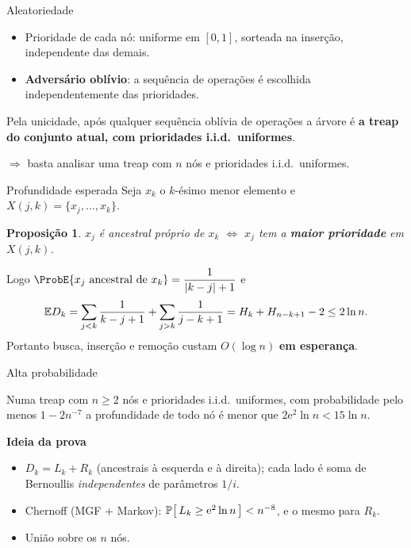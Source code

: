 \documentclass[aspectratio=169,11pt]{beamer}
\newtheorem{proposicao}[theorem]{Proposição}
\theoremstyle{definition}
\begin{document}
\begin{frame}{Aleatoriedade}
  \begin{itemize}
  \item Prioridade de cada nó: uniforme em $[0,1]$, sorteada na
    inserção, independente das demais.
  \item \textbf{Adversário oblívio}: a sequência de operações é
    escolhida independentemente das prioridades.
  \end{itemize}
  \pause
  Pela unicidade, após qualquer sequência oblívia de operações a árvore
  é \textbf{a treap do conjunto atual, com prioridades i.i.d.\
    uniformes}.
 
  $\Rightarrow$ basta analisar uma treap com $n$ nós e prioridades
  i.i.d.\ uniformes.
\end{frame}
 
\begin{frame}{Profundidade esperada}
  Seja $x_k$ o $k$-ésimo menor elemento e $X(j,k)=\{x_j,\dots,x_k\}$.
  \begin{proposicao}
    $x_j$ é ancestral próprio de $x_k$ $\iff$ $x_j$ tem a
    \textbf{maior prioridade} em $X(j,k)$.
  \end{proposicao}
  \pause
  Logo $\ProbE{x_j \text{ ancestral de } x_k}=\dfrac1{|k-j|+1}$ e
  \[
    \mathbb{E}{D_k}=\sum_{j<k}\frac1{k-j+1}+\sum_{j>k}\frac1{j-k+1}
    =H_k+H_{n-k+1}-2\le 2\ln n .
  \]
  \pause
  Portanto busca, inserção e remoção custam $O(\log n)$ \textbf{em
    esperança}.
\end{frame}
 
\begin{frame}{Alta probabilidade}
  \begin{theorem}
    Numa treap com $n\ge2$ nós e prioridades i.i.d.\ uniformes, com
    probabilidade pelo menos $1-2n^{-7}$ a profundidade de todo nó é
    menor que $2\mathrm e^2\ln n<15\ln n$.
  \end{theorem}
  \pause
  \textbf{Ideia da prova}
  \begin{itemize}
  \item $D_k=L_k+R_k$ (ancestrais à esquerda e à direita); cada lado é
    soma de Bernoullis \emph{independentes} de parâmetros $1/i$.
  \item Chernoff (MGF + Markov): $\ProbE{L_k\ge \mathrm e^2\ln n}<n^{-8}$,
    e o mesmo para $R_k$.
  \item União sobre os $n$ nós.
  \end{itemize}
\end{frame}
 
\end{document}
